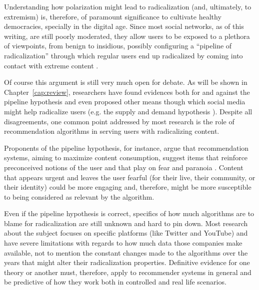 Understanding how polarization might lead to radicalization (and, ultimately, to
extremism) is, therefore, of paramount significance to cultivate healthy
democracies, specially in the digital age. Since most social networks, as of
this writing, are still poorly moderated, they allow users to be exposed to a
plethora of viewpoints, from benign to insidious, possibly configuring a
``pipeline of radicalization'' through which regular users end up radicalized by
coming into contact with extreme content \citep{ribeiro_auditing_2020}.

Of course this argument is still very much open for debate. As will be shown in
Chapter~\ref{cap:review}, researchers have found evidences both for and against
the pipeline hypothesis and even proposed other means though which social media
might help radicalize users (e.g. the supply and demand hypothesis
\citep{munger_right-wing_2020}). Despite all disagreements, one common point
addressed by most research is the role of recommendation algorithms in serving
users with radicalizing content.

Proponents of the pipeline hypothesis, for instance, argue that recommendation
systems, aiming to maximize content consumption, suggest items that reinforce
preconceived notions of the user and that play on fear and paranoia
\citep{ribeiro_auditing_2020}. Content that appears urgent and leaves the user
fearful (for their live, their community, or their identity) could be more
engaging and, therefore, might be more susceptible to being considered as
relevant by the algorithm.

Even if the pipeline hypothesis is correct, specifics of how much algorithms are
to blame for radicalization are still unknown and hard to pin down. Most
research about the subject focuses on specific platforms (like Twitter and
YouTube) and have severe limitations with regards to how much data those
companies make available, not to mention the constant changes made to the
algorithms over the years that might alter their radicalization properties.
Definitive evidence for one theory or another must, therefore, apply to
recommender systems in general and be predictive of how they work both in
controlled and real life scenarios.


